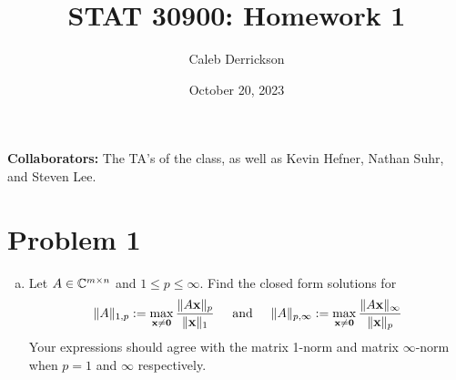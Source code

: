 

\title{STAT 30900: Homework 1}
\author{Caleb Derrickson}
\date{October 20, 2023}


\onehalfspacing
\maketitle

{\color{cit}\vspace{2mm}\noindent\textbf{Collaborators:}} The TA's of the class, as well as Kevin Hefner, Nathan Suhr, and Steven Lee.

\tableofcontents

\newpage
\section{Problem 1}
\begin{enumerate}[(a)]
    \item Let $A \in \mathbb{C}^{m \times n}$ and $1 \leq p \leq \infty$. Find the closed form solutions for 
    \[
    \lVert A \rVert_{1, p} := \max_{\textbf{x} \neq \textbf{0}} \frac{\lVert A\textbf{x} \rVert_{p}}{\lVert \textbf{x} \rVert_1} \hspace{5mm} \text{and} \hspace{5mm} \lVert A \rVert_{p, \infty} := \max_{\textbf{x} \neq \textbf{0}} \frac{\lVert A\textbf{x} \rVert_{\infty}}{\lVert \textbf{x} \rVert_p} 
    \]
    Your expressions should agree with the matrix 1-norm and matrix $\infty$-norm when $p = 1$ and $\infty$ respectively.
    \partbreak
    \begin{solution}
        
    \end{solution}
\end{enumerate}

